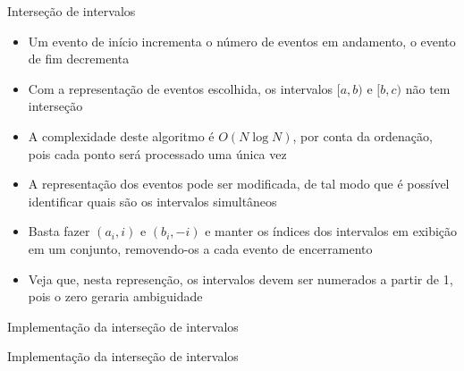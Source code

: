 \begin{frame}[fragile]{Interseção de intervalos}

    \begin{itemize}
        \item Um evento de início incrementa o número de eventos em andamento, o evento de fim
            decrementa
        \pause

        \item Com a representação de eventos escolhida, os intervalos $[a, b)$ e $[b, c)$ não tem
            interseção
        \pause

        \item A complexidade deste algoritmo é $O(N\log N)$, por conta da ordenação, pois
            cada ponto será processado uma única vez
        \pause

        \item A representação dos eventos pode ser modificada, de tal modo que é possível 
            identificar quais são os intervalos simultâneos
        \pause

        \item Basta fazer $(a_i, i)$ e $(b_i, -i)$ e manter os índices dos intervalos em
            exibição em um conjunto, removendo-os a cada evento de encerramento
        \pause

        \item Veja que, nesta represenção, os intervalos devem ser numerados a partir de 1,
            pois o zero geraria ambiguidade
    \end{itemize}

\end{frame}



\begin{frame}[fragile]{Implementação da interseção de intervalos}
\end{frame}

\begin{frame}[fragile]{Implementação da interseção de intervalos}
\end{frame}
